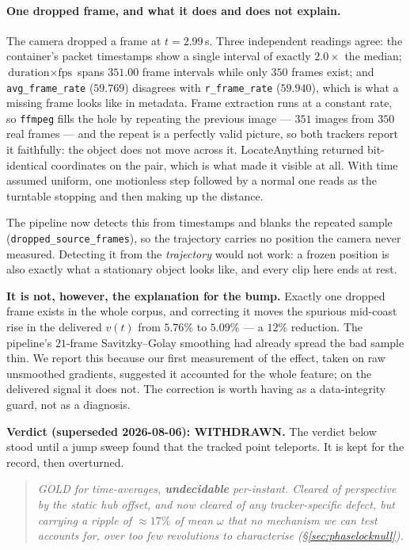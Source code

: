\documentclass[11pt,a4paper]{article}
\newcommand{\und}{\textcolor{warn}{\textbf{undecidable}}}
\begin{document}
\paragraph{One dropped frame, and what it does and does not explain.}
The camera dropped a frame at $t=2.99$\,s. Three independent readings agree: the container's packet
timestamps show a single interval of exactly $2.0\times$ the median; $\text{duration}\times\text{fps}$
spans $351.00$ frame intervals while only $350$ frames exist; and \texttt{avg\_frame\_rate}
($59.769$) disagrees with \texttt{r\_frame\_rate} ($59.940$), which is what a missing frame looks
like in metadata. Frame extraction runs at a constant rate, so \texttt{ffmpeg} fills the hole by
repeating the previous image --- $351$ images from $350$ real frames --- and the repeat is a
perfectly valid picture, so both trackers report it faithfully: the object does not move across it.
LocateAnything returned bit-identical coordinates on the pair, which is what made it visible at all.
With time assumed uniform, one motionless step followed by a normal one reads as the turntable
stopping and then making up the distance.

The pipeline now detects this from timestamps and blanks the repeated sample
(\texttt{dropped\_source\_frames}), so the trajectory carries no position the camera never measured.
Detecting it from the \emph{trajectory} would not work: a frozen position is also exactly what a
stationary object looks like, and every clip here ends at rest.

\textbf{It is not, however, the explanation for the bump.} Exactly one dropped frame exists in the
whole corpus, and correcting it moves the spurious mid-coast rise in the delivered $v(t)$ from
$5.76\%$ to $5.09\%$ --- a $12\%$ reduction. The pipeline's $21$-frame Savitzky--Golay smoothing had
already spread the bad sample thin. We report this because our first measurement of the effect, taken
on raw unsmoothed gradients, suggested it accounted for the whole feature; on the delivered signal it
does not. The correction is worth having as a data-integrity guard, not as a diagnosis.

\textbf{Verdict (superseded 2026-08-06): WITHDRAWN.} The verdict below stood until a jump sweep
found that the tracked point teleports. It is kept for the record, then overturned.

\begin{quote}
\emph{GOLD for time-averages, \und{} per-instant. Cleared of perspective by the static hub offset,
and now cleared of any tracker-specific defect, but carrying a ripple of $\approx 17\%$ of mean
$\omega$ that no mechanism we can test accounts for, over too few revolutions to characterise
(\S\ref{sec:phaselocknull}).}
\end{quote}
\end{document}
